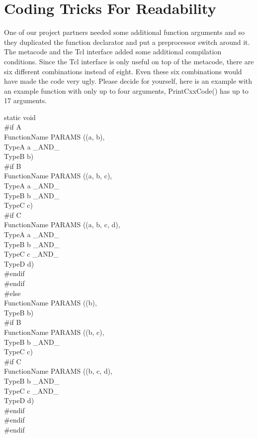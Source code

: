 
%
%

\chapter{\label{coding-tricks}Coding Tricks For Readability}


One of our project partners needed some additional function arguments and so they duplicated the function declarator and put a preprocessor switch around it.
The metacode and the Tcl interface added some additional compilation conditions.
Since the Tcl interface is only useful on top of the metacode, there are six different combinations instead of eight.
Even these six combinations would have made the code very ugly.
Please decide for yourself, here is an example with an example function with only up to four arguments, {\C PrintCxxCode()} has up to 17 arguments.

\begin{Ccode}
static void\\
\#if A\\
FunctionName PARAMS ((a, b),\\
  \>TypeA a \_AND\_\\
  \>TypeB b)\\
\#if B\\
FunctionName PARAMS ((a, b, c),\\
  \>TypeA a \_AND\_\\
  \>TypeB b \_AND\_\\
  \>TypeC c)\\
\#if C\\
FunctionName PARAMS ((a, b, c, d),\\
  \>TypeA a \_AND\_\\
  \>TypeB b \_AND\_\\
  \>TypeC c \_AND\_\\
  \>TypeD d)\\
\#endif\\
\#endif\\
\#else\\
FunctionName PARAMS ((b),\\
  \>TypeB b)\\
\#if B\\
FunctionName PARAMS ((b, c),\\
  \>TypeB b \_AND\_\\
  \>TypeC c)\\
\#if C\\
FunctionName PARAMS ((b, c, d),\\
  \>TypeB b \_AND\_\\
  \>TypeC c \_AND\_\\
  \>TypeD d)\\
\#endif\\
\#endif\\
\#endif
\end{Ccode}

